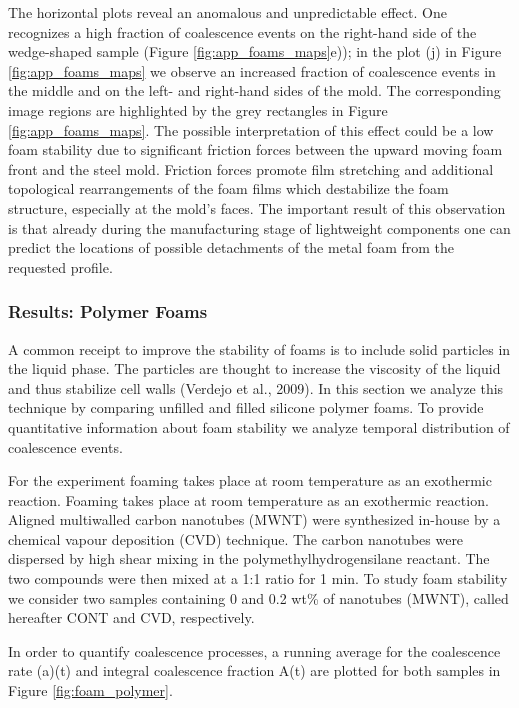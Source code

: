 The horizontal plots reveal an
anomalous and unpredictable effect. One recognizes
a high fraction of coalescence
events on the right-hand side of the
wedge-shaped sample (Figure \ref{fig:app_foams_maps}e)); in the plot (j) in Figure \ref{fig:app_foams_maps}
we observe an increased fraction of
coalescence events in the middle and on
the left- and right-hand sides of the
mold. The corresponding image regions
are highlighted by the grey rectangles in Figure \ref{fig:app_foams_maps}.
The possible interpretation of this effect
could be a low foam stability due to
 significant friction forces between
the upward moving foam front and the
steel mold. Friction forces promote film
stretching and additional topological
rearrangements of the foam films which
destabilize the foam structure, especially
at the mold’s faces. The important result of this
observation is that already
during the manufacturing stage of lightweight
components one can predict the
locations of possible detachments of the
metal foam from the requested profile.




\subsubsection{Results: Polymer Foams}
\label{foam_polymer}

A common receipt to improve the stability of foams is to include solid particles in the liquid phase. The particles are thought to increase the viscosity of the liquid and thus stabilize cell walls (Verdejo et al., 2009). In this section we analyze this technique by comparing
unfilled and filled silicone polymer foams. To provide quantitative information about foam stability we analyze temporal distribution of coalescence events.

For the experiment foaming takes place at room temperature as an exothermic reaction. Foaming takes place at room temperature as an exothermic reaction. Aligned multiwalled carbon nanotubes (MWNT) were synthesized in-house
by a chemical vapour deposition (CVD) technique. 
The carbon nanotubes were dispersed by high shear mixing in the polymethylhydrogensilane reactant. The two compounds were then mixed at a 1:1 ratio for 1 min. To study foam stability we consider two samples containing 0 and 0.2 wt\% of nanotubes (MWNT), called hereafter CONT and CVD, respectively.


In order to quantify coalescence processes, a running average for the coalescence rate (a)(t) and integral coalescence
fraction A(t) are plotted for both samples in Figure \ref{fig:foam_polymer}.


